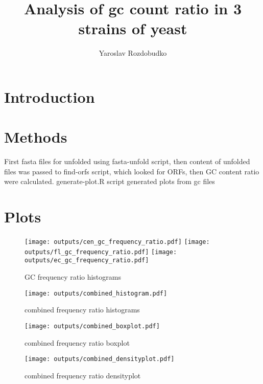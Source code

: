 \documentclass{article}
\title{Analysis of gc count ratio in 3 strains of yeast}
\author{Yaroslav Rozdobudko}
\begin{document}
\maketitle

\section{Introduction}



\section{Methods}

First fasta files for unfolded using fasta-unfold script, then content of unfolded files was passed to find-orfs script,
which looked for ORFs, then GC content ratio were calculated.
generate-plot.R script generated plots from gc files

\section{Plots}

\begin{figure}
    \texttt{[image: outputs/cen\_gc\_frequency\_ratio.pdf]}
    \texttt{[image: outputs/fl\_gc\_frequency\_ratio.pdf]}
    \texttt{[image: outputs/ec\_gc\_frequency\_ratio.pdf]}
    \caption{GC frequency ratio histograms}
\end{figure}

\begin{figure}
    \texttt{[image: outputs/combined\_histogram.pdf]}
    \caption{combined frequency ratio histograms}
\end{figure}

\begin{figure}
    \texttt{[image: outputs/combined\_boxplot.pdf]}
    \caption{combined frequency ratio boxplot}
\end{figure}

\begin{figure}
    \texttt{[image: outputs/combined\_densityplot.pdf]}
    \caption{combined frequency ratio densityplot}
\end{figure}
\end{document}
